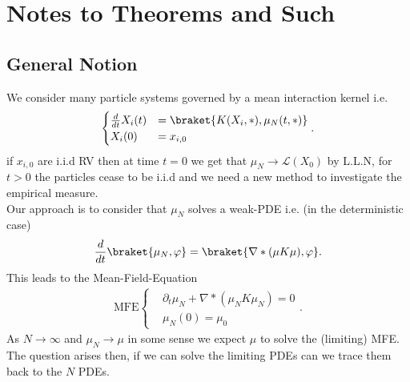 \chapter{Notes to Theorems and Such}
\section{General Notion}
We consider many particle systems governed by a mean interaction kernel i.e.
\begin{align*}
  \begin{cases}
    \frac{d}{dt} X_i(t) &= \braket{K(X_i,*),\mu_N(t,*)}\\
    X_i(0) &= x_{i,0}
  \end{cases}
.\end{align*}
if $x_{i,0}$ are i.i.d RV then at time $t=0$ we  get that $\mu_N \to \mathcal{L}(X_{0})$ by L.L.N,
for $t>0$ the particles cease to be i.i.d and we need a new method to investigate the empirical measure.\\[1ex]
Our approach is to consider that $\mu_N$ solves a weak-PDE i.e.  (in the deterministic case)
\begin{align*}
  \frac{d}{dt} \braket{\mu_N,\phi } = \braket{\nabla * (\mu K \mu ),\phi }
.\end{align*}
This leads to the Mean-Field-Equation
\begin{align*}
  \text{MFE}\begin{cases}
    &\partial_t \mu_N  + \nabla * (\mu_N K \mu_N) = 0 \\
    &\mu_N(0) = \mu_0
  \end{cases}
.\end{align*}
As $N\to \infty$ and $\mu_N \to \mu$ in some sense we expect $\mu $ to solve the (limiting) MFE. 
The question arises then, if we can solve the limiting PDEs can we trace them back to the $N$ PDEs.
